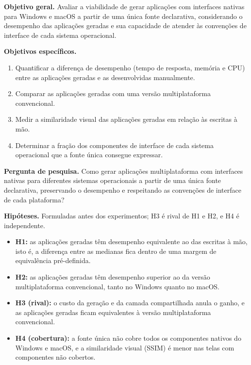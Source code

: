 
\textbf{Objetivo geral.} Avaliar a viabilidade de gerar aplicações com interfaces nativas para Windows e macOS a partir de uma única fonte declarativa, considerando o desempenho das aplicações geradas e sua capacidade de atender às convenções de interface de cada sistema operacional.

\textbf{Objetivos específicos.}
\begin{enumerate}
  \item Quantificar a diferença de desempenho (tempo de resposta, memória e CPU) entre as aplicações geradas e as desenvolvidas manualmente.
  \item Comparar as aplicações geradas com uma versão multiplataforma convencional.
  \item Medir a similaridade visual das aplicações geradas em relação às escritas à mão.
  \item Determinar a fração dos componentes de interface de cada sistema operacional que a fonte única consegue expressar.
\end{enumerate}

\textbf{Pergunta de pesquisa.} Como gerar aplicações multiplataforma com interfaces nativas para diferentes sistemas operacionais a partir de uma única fonte declarativa, preservando o desempenho e respeitando as convenções de interface de cada plataforma?

\textbf{Hipóteses.} Formuladas antes dos experimentos; H3 é rival de H1 e H2, e H4 é independente.
\begin{itemize}
  \item \textbf{H1:} as aplicações geradas têm desempenho equivalente ao das escritas à mão, isto é, a diferença entre as medianas fica dentro de uma margem de equivalência pré-definida.
  \item \textbf{H2:} as aplicações geradas têm desempenho superior ao da versão multiplataforma convencional, tanto no Windows quanto no macOS.
  \item \textbf{H3 (rival):} o custo da geração e da camada compartilhada anula o ganho, e as aplicações geradas ficam equivalentes à versão multiplataforma convencional.
  \item \textbf{H4 (cobertura):} a fonte única não cobre todos os componentes nativos do Windows e macOS, e a similaridade visual (SSIM) é menor nas telas com componentes não cobertos.
\end{itemize}
